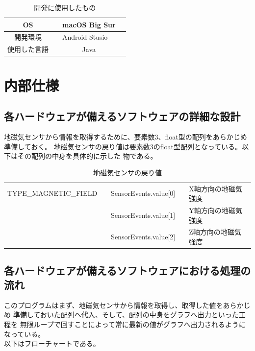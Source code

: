 \documentclass[dvipdfmx,autodetect-engine,titlepage]{jsarticle}
\begin{document}
 \begin{table}[h]
    \caption{開発に使用したもの}
    \centering
    \begin{tabular}{clcl}
    \hline
    OS     &  & macOS Big Sur                      &  \\ \hline
    開発環境   &  & \multicolumn{1}{l}{Android Stusio} &  \\ \hline
    使用した言語 &  & Java                               &  \\ \hline
    \end{tabular}
    \end{table}

\section{内部仕様}

\subsection{各ハードウェアが備えるソフトウェアの詳細な設計}

地磁気センサから情報を取得するために、要素数3、float型の配列をあらかじめ準備しておく。
地磁気センサの戻り値は要素数3のfloat型配列となっている。以下はその配列の中身を具体的に示した
物である。

\begin{table}[h]
  \caption{地磁気センサの戻り値}
  \centering
  \begin{tabular}{lllll}
  \hline
  \multicolumn{1}{c}{TYPE\_MAGNETIC\_FIELD} &  & SensorEvents.value{[}0{]} &  & X軸方向の地磁気強度 \\ \cline{2-5} 
                                            &  & SensorEvents.value{[}1{]} &  & Y軸方向の地磁気強度 \\ \cline{2-5} 
                                            &  & SensorEvents.value{[}2{]} &  & Z軸方向の地磁気強度 \\ \hline
  \end{tabular}
  \end{table}

\subsection{各ハードウェアが備えるソフトウェアにおける処理の流れ}
このプログラムはまず、地磁気センサから情報を取得し、取得した値をあらかじめ
準備しておいた配列へ代入、そして、配列の中身をグラフへ出力といった工程を
無限ループで回すことによって常に最新の値がグラフへ出力されるようになっている。\\
以下はフローチャートである。\\
\end{document}
